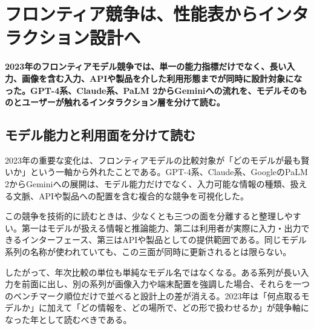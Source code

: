 \section{フロンティア競争は、性能表からインタラクション設計へ}
\noindent\textbf{2023年のフロンティアモデル競争では、単一の能力指標だけでなく、長い入力、画像を含む入力、APIや製品を介した利用形態までが同時に設計対象になった。GPT-4系、Claude系、PaLM 2からGeminiへの流れを、モデルそのものとユーザーが触れるインタラクション層を分けて読む。}\autocite{src-013fa77665db,src-2b6af707f3ef,src-3375c5d27d9b,src-39071a9443e5,src-5bfa9c93d034,src-93d355bf8806,src-a3dead6cff65,src-a95452783369,src-b1525886b462,src-db671ee1d1b8,src-e116708067ab,src-f5041642fb21,src-f951bda6a0f4,src-fd9cb9c0061f}

\subsection{モデル能力と利用面を分けて読む}

2023年の重要な変化は、フロンティアモデルの比較対象が「どのモデルが最も賢いか」という一軸から外れたことである。GPT-4系、Claude系、GoogleのPaLM 2からGeminiへの展開は、モデル能力だけでなく、入力可能な情報の種類、扱える文脈、APIや製品への配置を含む複合的な競争を可視化した。\autocite{src-013fa77665db,src-3375c5d27d9b,src-39071a9443e5,src-5bfa9c93d034,src-93d355bf8806,src-a3dead6cff65,src-a95452783369,src-b1525886b462,src-db671ee1d1b8,src-f5041642fb21,src-f951bda6a0f4,src-fd9cb9c0061f}


この競争を技術的に読むときは、少なくとも三つの面を分離すると整理しやすい。第一はモデルが扱える情報と推論能力、第二は利用者が実際に入力・出力できるインターフェース、第三はAPIや製品としての提供範囲である。同じモデル系列の名称が使われていても、この三面が同時に更新されるとは限らない。\autocite{src-013fa77665db,src-3375c5d27d9b,src-39071a9443e5,src-5bfa9c93d034,src-93d355bf8806,src-a3dead6cff65,src-a95452783369,src-b1525886b462,src-db671ee1d1b8,src-f5041642fb21,src-f951bda6a0f4,src-fd9cb9c0061f}


したがって、年次比較の単位も単純なモデル名ではなくなる。ある系列が長い入力を前面に出し、別の系列が画像入力や端末配置を強調した場合、それらを一つのベンチマーク順位だけで並べると設計上の差が消える。2023年は「何点取るモデルか」に加えて「どの情報を、どの場所で、どの形で扱わせるか」が競争軸になった年として読むべきである。\autocite{src-3375c5d27d9b,src-5bfa9c93d034,src-93d355bf8806,src-a3dead6cff65,src-a95452783369,src-db671ee1d1b8,src-e116708067ab,src-f951bda6a0f4,src-fd9cb9c0061f}


